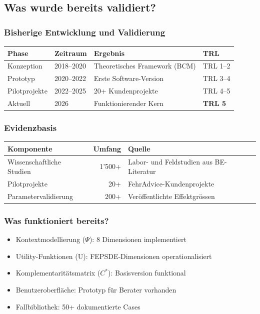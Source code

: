 \documentclass[11pt,a4paper]{article}
\begin{document}
\subsection{Was wurde bereits validiert?}

\subsubsection{Bisherige Entwicklung und Validierung}

\begin{table}[h]
\centering
\begin{tabular}{llll}
\toprule
\textbf{Phase} & \textbf{Zeitraum} & \textbf{Ergebnis} & \textbf{TRL} \\
\midrule
Konzeption & 2018--2020 & Theoretisches Framework (BCM) & TRL 1--2 \\
Prototyp & 2020--2022 & Erste Software-Version & TRL 3--4 \\
Pilotprojekte & 2022--2025 & 20+ Kundenprojekte & TRL 4--5 \\
Aktuell & 2026 & Funktionierender Kern & \textbf{TRL 5} \\
\bottomrule
\end{tabular}
\end{table}

\subsubsection{Evidenzbasis}

\begin{table}[h]
\centering
\begin{tabular}{lrl}
\toprule
\textbf{Komponente} & \textbf{Umfang} & \textbf{Quelle} \\
\midrule
Wissenschaftliche Studien & 1'500+ & Labor- und Feldstudien aus BE-Literatur \\
Pilotprojekte & 20+ & FehrAdvice-Kundenprojekte \\
Parametervalidierung & 200+ & Veröffentlichte Effektgrössen \\
\bottomrule
\end{tabular}
\end{table}

\subsubsection{Was funktioniert bereits?}

\begin{itemize}
    \item[\checkmark] Kontextmodellierung ($\Psi$): 8 Dimensionen implementiert
    \item[\checkmark] Utility-Funktionen (U): FEPSDE-Dimensionen operationalisiert
    \item[\checkmark] Komplementaritätsmatrix ($C^*$): Basisversion funktional
    \item[\checkmark] Benutzeroberfläche: Prototyp für Berater vorhanden
    \item[\checkmark] Fallbibliothek: 50+ dokumentierte Cases
\end{itemize}
\end{document}
